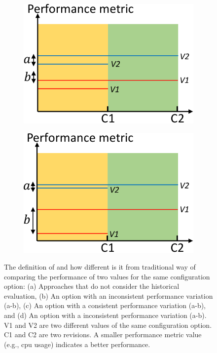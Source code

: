 \begin{figure}[t]
        \begin{subfigure}{0.25\textwidth}
                \includegraphics[width=\linewidth]{Figures/background-c.pdf}
                \caption{}
                \label{fig:description-c}
        \end{subfigure}%
        \begin{subfigure}{0.25\textwidth}
                \includegraphics[width=\linewidth]{Figures/background-d.pdf}
                \caption{}
                \label{fig:description-d}
        \end{subfigure}%
	\caption{The definition of \inconsistent and how different is it from traditional way of comparing the performance of two values for the same configuration option: (a) Approaches that do not consider the historical evaluation, (b) An option with an inconsistent performance variation (a-b), (c) An option with a consistent performance variation (a-b), and (d) An option with a inconsistent performance variation (a-b). V1 and V2 are two different values of the same configuration option. C1 and C2 are two revisions. A smaller performance metric value (e.g., cpu usage) indicates a better performance.
}
\end{figure}
